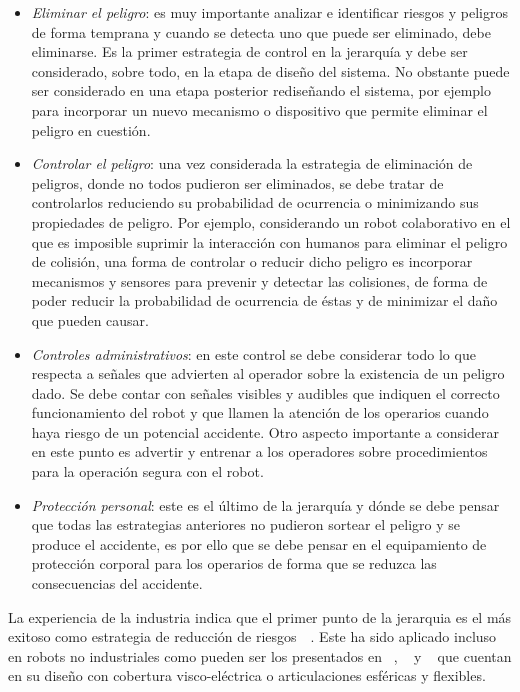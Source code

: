 \documentclass[withindex,glossary]{cam-thesis}
\begin{document}
\begin{itemize}
\item \textit{Eliminar el peligro}: es muy importante analizar e identificar riesgos y peligros de forma temprana y cuando se detecta uno que puede ser eliminado, debe eliminarse. Es la primer estrategia de control en la jerarquía y debe ser considerado, sobre todo, en la etapa de diseño del sistema. No obstante puede ser considerado en una etapa posterior rediseñando el sistema, por ejemplo para incorporar un nuevo mecanismo o dispositivo que permite eliminar el peligro en cuestión.
\item \textit{Controlar el peligro}: una vez considerada la estrategia de eliminación de peligros, donde no todos pudieron ser eliminados, se debe tratar de controlarlos reduciendo su probabilidad de ocurrencia o minimizando sus propiedades de peligro. Por ejemplo, considerando un robot colaborativo en el que es imposible suprimir la interacción con humanos para eliminar el peligro de colisión, una forma de controlar o reducir dicho peligro es incorporar mecanismos y sensores para prevenir y detectar las colisiones, de forma de poder reducir la probabilidad de ocurrencia de éstas y de minimizar el daño que pueden causar.
\item \textit{Controles administrativos}: en este control se debe considerar todo lo que respecta a señales que advierten al operador sobre la existencia de un peligro dado. Se debe contar con señales visibles y audibles que indiquen el correcto funcionamiento del robot y que llamen la atención de los operarios cuando haya riesgo de un potencial accidente. 
Otro aspecto importante a considerar en este punto es advertir y entrenar a los operadores sobre procedimientos para la operación segura con el robot.
\item \textit{Protección personal}: este es el último de la jerarquía y dónde se debe pensar que todas las estrategias anteriores no pudieron sortear el peligro y se produce el accidente, es por ello que se debe pensar en el equipamiento de protección corporal para los operarios de forma que se reduzca las consecuencias del accidente.
\end{itemize}
La experiencia de la industria indica que el primer punto de la jerarquia es el más exitoso como estrategia de reducción de riesgos~\cite{ANSIRIA1506}~\cite{IEC61508}. Este ha sido aplicado incluso en robots no industriales como pueden ser los presentados en ~\cite{Yamada1997}, ~\cite{Yamada1999} y ~\cite{Bicchia} que cuentan en su diseño con cobertura visco-eléctrica o articulaciones esféricas y flexibles.
\end{document}
